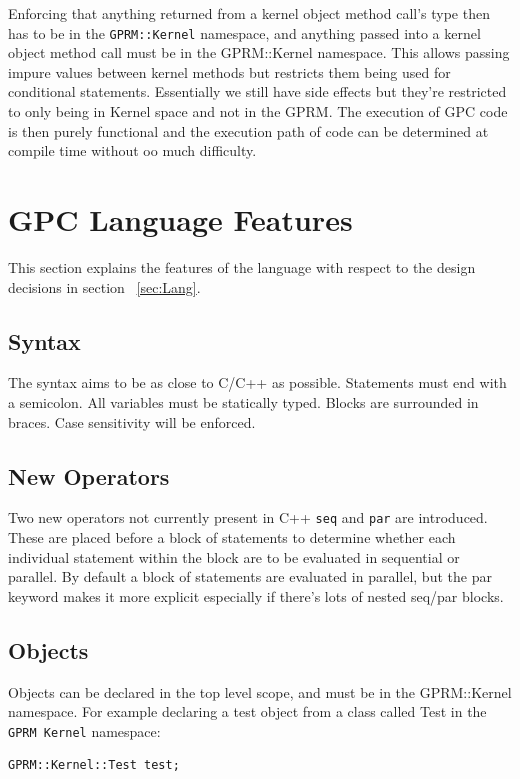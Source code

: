 Enforcing that anything returned from a kernel object method call's type then has to be in the 
\texttt{GPRM::Kernel} namespace, and anything passed into a kernel object method call must be in the GPRM::Kernel
namespace. This allows passing impure values between kernel methods but restricts them being used
for conditional statements. Essentially we still have side effects but they're restricted to
only being in Kernel space and not in the GPRM. The execution of GPC code is then purely functional
and the execution path of code can be determined at compile time without oo much difficulty.

\section{GPC Language Features}

    This section explains the features of the language with respect to the design decisions in section ~\ref{sec:Lang}.

\subsection{Syntax}
        The syntax aims to be as close to C/C++ as possible. Statements must end with a semicolon. 
        All variables must be statically typed. Blocks are surrounded in braces. Case sensitivity
        will be enforced.

\subsection{New Operators}
        Two new operators not currently present in C++ \texttt{seq} and \texttt{par} are introduced. 
        These are placed before a block
        of statements to determine whether each individual statement within the block are
        to be evaluated in sequential or parallel. By default a block of statements are evaluated
        in parallel, but the par keyword makes it more explicit especially if there's lots of nested
        seq/par blocks.

\subsection{Objects}
Objects can be declared in the top level scope, and must be in the GPRM::Kernel namespace.
For example declaring a test object from a class called Test in the \texttt{GPRM Kernel} namespace:

\begin{lstlisting}[style=myGPC]
GPRM::Kernel::Test test;
\end{lstlisting}

